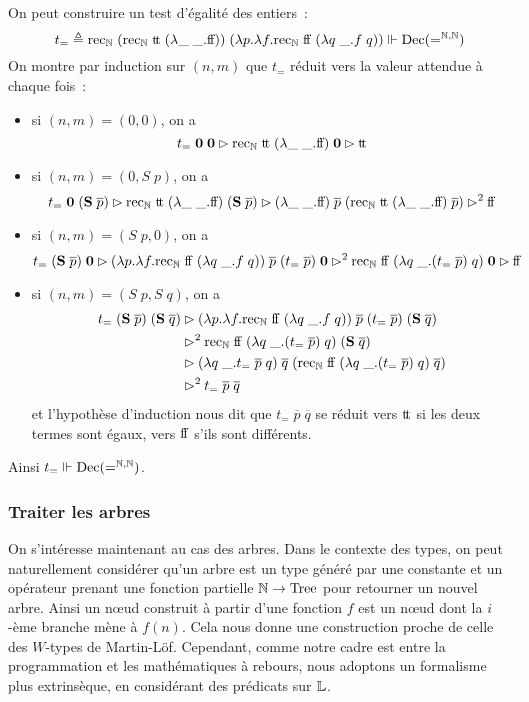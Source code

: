 \documentclass{article}
\begin{document}
\begin{expl}
  On peut construire un test d'égalité des entiers~:
  \[t_= \triangleq \mathrm{rec}_{\mathbb{N}}\;(\mathrm{rec}_{\mathbb{N}}\;\mathrm{t}\!\mathrm{t}\;(\lambda\_\;\_.\mathrm{f}\!\mathrm{f}))\;(\lambda p.\lambda f.\mathrm{rec}_{\mathbb{N}}\;\mathrm{f}\!\mathrm{f}\;(\lambda q\;\_. f\;q))\Vdash\mathrm{Dec}(=^{\mathbb{N},\mathbb{N}})\]
  On montre par induction sur $(n,m)$ que $t_=$ réduit vers la valeur attendue à chaque fois~:
  \begin{itemize}
  \item si $(n,m) = (0,0)$, on a
    \[t_=\;\boldsymbol 0\;\boldsymbol 0 \rhd \mathrm{rec}_{\mathbb{N}}\;\mathrm{t}\!\mathrm{t}\;(\lambda \_\;\_.\mathrm{f}\!\mathrm{f})\;\boldsymbol 0\rhd \mathrm{t}\!\mathrm{t}\]
  \item si $(n,m) = (0,S\;p)$, on a
    \[t_=\;\boldsymbol 0\;(\mathbf{S}\;\overline p)\rhd \mathrm{rec}_{\mathbb{N}}\;\mathrm{t}\!\mathrm{t}\;(\lambda\_\;\_.\mathrm{f}\!\mathrm{f})\;(\mathbf{S}\;\overline p)\rhd (\lambda\_\;\_.\mathrm{f}\!\mathrm{f})\;\overline p\;(\mathrm{rec}_{\mathbb{N}}\;\mathrm{t}\!\mathrm{t}\;(\lambda\_\;\_.\mathrm{f}\!\mathrm{f})\;\overline p) \rhd^2 \mathrm{f}\!\mathrm{f}\]
  \item si $(n,m) = (S\;p,0)$, on a
    \[t_=\;(\mathbf{S}\;\overline p)\;\boldsymbol 0\rhd (\lambda p.\lambda f.\mathrm{rec}_{\mathbb{N}}\;\mathrm{f}\!\mathrm{f}\;(\lambda q\;\_.f\;q))\;\overline p\;(t_=\;\overline p)\;\boldsymbol 0\rhd^2 \mathrm{rec}_{\mathbb{N}}\;\mathrm{f}\!\mathrm{f}\;(\lambda q\;\_.(t_=\;\overline p)\;q)\;\boldsymbol 0 \rhd \mathrm{f}\!\mathrm{f}\]
  \item si $(n,m) = (S\;p,S\;q)$, on a
    \begin{align*}
      t_=\;(\mathbf{S}\;\overline p)\;(\mathbf{S}\;\overline q)&\rhd (\lambda p.\lambda f.\mathrm{rec}_{\mathbb{N}}\;\mathrm{f}\!\mathrm{f}\;(\lambda q\;\_.f\;q))\;\overline p\;(t_=\;\overline p)\;(\mathbf{S}\;\overline q)\\
      &\rhd^2 \mathrm{rec}_{\mathbb{N}}\;\mathrm{f}\!\mathrm{f}\;(\lambda q\;\_.(t_=\;\overline p)\;q)\;(\mathbf{S}\;\overline q)\\
      &\rhd (\lambda q\;\_.t_=\;\overline p\;q)\;\overline q\;(\mathrm{rec}_{\mathbb{N}}\;\mathrm{f}\!\mathrm{f}\;(\lambda q\;\_.(t_=\;\overline p)\;q)\;\overline q)\\
      &\rhd^2 t_=\;\overline p\;\overline q
    \end{align*}
    et l'hypothèse d'induction nous dit que $t_=\;\overline p\;\overline q$ se réduit vers $\mathrm{t}\!\mathrm{t}$ si les deux termes sont égaux, vers $\mathrm{f}\!\mathrm{f}$ s'ils sont différents.
  \end{itemize}
  Ainsi $t_=\Vdash \mathrm{Dec}(=^{\mathbb{N},\mathbb{N}})$.
\end{expl}

\subsubsection{Traiter les arbres}

On s'intéresse maintenant au cas des arbres. Dans le contexte des types, on peut naturellement considérer qu'un arbre est un type généré par une constante et un opérateur prenant une fonction partielle $\mathbb{N} \to \mathrm{Tree}$ pour retourner un nouvel arbre. Ainsi un n\oe ud construit à partir d'une fonction $f$ est un n\oe ud dont la $i$-ème branche mène à $f(n)$. Cela nous donne une construction proche de celle des $W$-types de Martin-Löf. Cependant, comme notre cadre est entre la programmation et les mathématiques à rebours, nous adoptons un formalisme plus extrinsèque, en considérant des prédicats sur $\mathbb{L}$.
\end{document}
